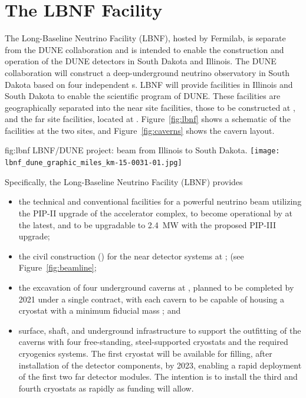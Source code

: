 \section{The LBNF Facility} %

The Long-Baseline Neutrino
Facility (LBNF), hosted by Fermilab, is separate from the DUNE collaboration and is intended to enable the construction and operation of the DUNE detectors in South Dakota and Illinois.
The DUNE collaboration will construct a deep-underground neutrino observatory in South Dakota based on four independent \nominalmodsize \lartpc{}s. %
LBNF will provide facilities in Illinois and South Dakota to enable the scientific program of DUNE.
These facilities are geographically separated into the near site facilities, those to be constructed
at \fnal, and the far site facilities, located at \surf. Figure~\ref{fig:lbnf} shows
a schematic of the facilities at the two sites, and Figure~\ref{fig:caverns} shows the cavern layout. 

\begin{dunefigure}{fig:lbnf}{ 	
LBNF/DUNE project: beam from Illinois to South Dakota.}
\texttt{[image: lbnf\_dune\_graphic\_miles\_km-15-0031-01.jpg]}
\end{dunefigure}

Specifically, the Long-Baseline Neutrino Facility (LBNF) provides
\begin{itemize}

\item  the  technical and conventional facilities for a powerful  neutrino beam utilizing the PIP-II upgrade of the \fnal accelerator 
complex, to become operational by \beamturnon  
at the latest, and to be upgradable to \SI{2.4}{\MW} with the proposed 
PIP-III upgrade;

\item  the civil construction () for the near detector systems at \fnal; (see Figure~\ref{fig:beamline}; 

\item the excavation of four underground caverns at \surf, planned to be completed 
by 2021 
under a single contract, with each cavern to be capable of housing a cryostat with 
a minimum \nominalmodsize fiducial mass \lartpc; and



\item surface, shaft, and underground infrastructure to support 
the outfitting of the caverns with four free-standing, steel-supported cryostats 
and the required cryogenics systems. The first cryostat will be available for filling, after installation of the detector components, by
2023, enabling a rapid deployment of the first two \nominalmodsize far detector modules. 
The intention is to install the third and fourth cryostats as rapidly as funding will 
allow.

\end{itemize}


